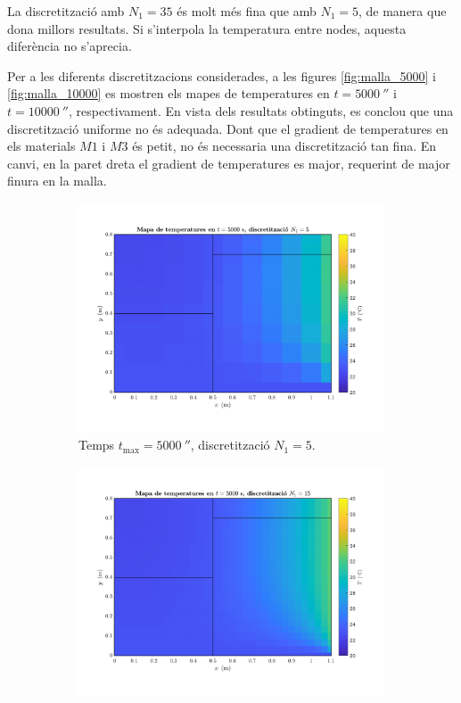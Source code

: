 \noindent
La discretització amb $N_1 = 35$ és molt més fina que amb $N_1 = 5$, de manera que dona millors resultats. Si s'interpola la temperatura entre nodes, aquesta diferència no s'aprecia.

Per a les diferents discretitzacions considerades, a les figures \ref{fig:malla_5000} i \ref{fig:malla_10000} es mostren els mapes de temperatures en $t = 5000 \ \second$ i $t = 10000 \ \second$, respectivament. En vista dels resultats obtinguts, es conclou que una discretització uniforme no és adequada. Dont que el gradient de temperatures en els materials $M1$ i $M3$ és petit, no és necessaria una discretització tan fina. En canvi, en la paret dreta el gradient de temperatures es major, requerint de major finura en la malla.

\begin{figure}[ht]
	\centering
	\begin{subfigure}{.5\textwidth}
		\centering
		\includegraphics[width=.95\linewidth]{imagenes/04_influencia/malla/malla_1.pdf}
		\vspace{-15pt}
		\caption{Temps $t_\text{max} = 5000 \ \second$, discretització $N_1 = 5$.}
		\label{fig:malla_1}
	\end{subfigure}%
	\begin{subfigure}{.5\textwidth}
		\centering
		\includegraphics[width=.95\linewidth]{imagenes/04_influencia/malla/malla_2.pdf}

\end{subfigure}
\end{figure}
